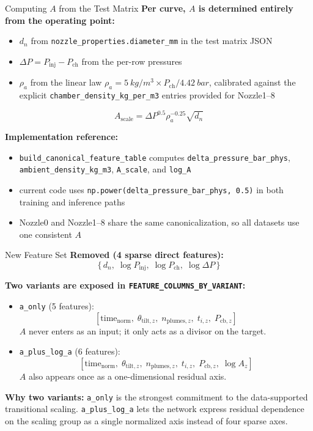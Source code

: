 \documentclass[UTF8,aspectratio=169]{ctexbeamer}
\begin{document}
\begin{frame}{Computing $A$ from the Test Matrix}
\textbf{Per curve, $A$ is determined entirely from the operating point:}
\begin{itemize}
  \item $d_n$ from \texttt{nozzle\_properties.diameter\_mm} in the test matrix JSON
  \item $\Delta P=P_{\mathrm{inj}}-P_{\mathrm{ch}}$ from the per-row pressures
  \item $\rho_a$ from the linear law $\rho_a=\SI{5}{kg/m^3}\times P_{\mathrm{ch}}/\SI{4.42}{bar}$, calibrated against the explicit \texttt{chamber\_density\_kg\_per\_m3} entries provided for Nozzle1--8
\end{itemize}

\vspace{0.2em}
\[
\boxed{A_{\mathrm{scale}}=\Delta P^{0.5}\rho_a^{-0.25}\sqrt{d_n}}
\]

\vspace{0.4em}
\textbf{Implementation reference:}
\begin{itemize}
  \item \texttt{build\_canonical\_feature\_table} computes \texttt{delta\_pressure\_bar\_phys}, \texttt{ambient\_density\_kg\_m3}, \texttt{A\_scale}, and \texttt{log\_A}
  \item current code uses \texttt{np.power(delta\_pressure\_bar\_phys, 0.5)} in both training and inference paths
  \item Nozzle0 and Nozzle1--8 share the same canonicalization, so all datasets use one consistent $A$
\end{itemize}
\end{frame}

\begin{frame}{New Feature Set}
\textbf{Removed (4 sparse direct features):}
\[
\{\,d_n,\;\log P_{\mathrm{inj}},\;\log P_{\mathrm{ch}},\;\log\Delta P\,\}
\]

\textbf{Two variants are exposed in \texttt{FEATURE\_COLUMNS\_BY\_VARIANT}:}
\begin{itemize}
  \item \texttt{a\_only} (5 features):
  \[
  [\text{time}_{\mathrm{norm}},\;\theta_{\mathrm{tilt},z},\;n_{\mathrm{plumes},z},\;t_{i,z},\;P_{\mathrm{cb},z}]
  \]
  $A$ never enters as an input; it only acts as a divisor on the target.
  \item \texttt{a\_plus\_log\_a} (6 features):
  \[
  [\text{time}_{\mathrm{norm}},\;\theta_{\mathrm{tilt},z},\;n_{\mathrm{plumes},z},\;t_{i,z},\;P_{\mathrm{cb},z},\;\log A_z]
  \]
  $A$ also appears once as a one-dimensional residual axis.
\end{itemize}

\textbf{Why two variants:} \texttt{a\_only} is the strongest commitment to the data-supported transitional scaling. \texttt{a\_plus\_log\_a} lets the network express residual dependence on the scaling group as a single normalized axis instead of four sparse axes.
\end{frame}
\end{document}
